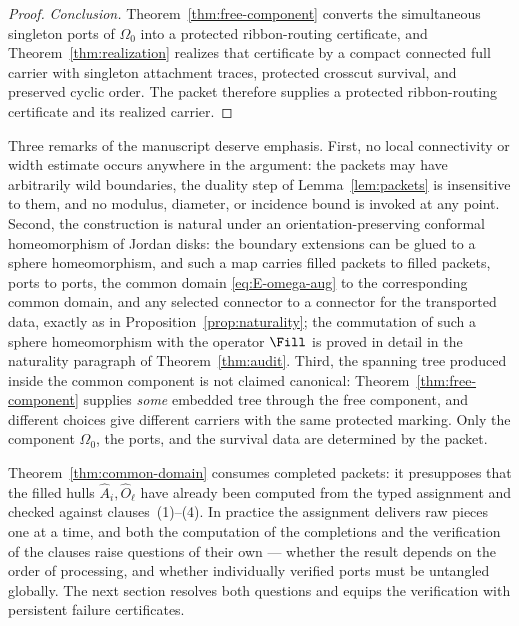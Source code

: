 \begin{proof}
\emph{Conclusion.}
Theorem~\ref{thm:free-component} converts the simultaneous singleton ports of
$\Omega_0$ into a protected ribbon-routing certificate, and
Theorem~\ref{thm:realization} realizes that certificate by a compact connected full
carrier with singleton attachment traces, protected crosscut survival, and preserved
cyclic order.  The packet therefore supplies a protected ribbon-routing
certificate and its realized carrier.
\end{proof}

\begin{remark}\label{rem:E-common-domain}
Three remarks of the manuscript \cite{MWman} deserve emphasis. First, no local
connectivity or width estimate occurs anywhere in the argument: the packets may have
arbitrarily wild boundaries, the duality step of Lemma~\ref{lem:packets} is
insensitive to them, and no modulus, diameter, or incidence bound is invoked at any
point. Second, the construction is natural under an orientation-preserving conformal
homeomorphism of Jordan disks: the boundary extensions can be glued to a sphere
homeomorphism, and such a map carries filled packets to filled packets, ports to
ports, the common domain \eqref{eq:E-omega-aug} to the corresponding common domain,
and any selected connector to a connector for the transported data, exactly as in
Proposition~\ref{prop:naturality}; the commutation of such a sphere homeomorphism
with the operator $\Fill$ is proved in detail in the naturality paragraph of
Theorem~\ref{thm:audit}. Third, the spanning tree produced inside the common
component is not claimed canonical: Theorem~\ref{thm:free-component} supplies
\emph{some} embedded tree through the free component, and different choices give
different carriers with the same protected marking. Only the component $\Omega_0$,
the ports, and the survival data are determined by the packet.
\end{remark}

Theorem~\ref{thm:common-domain} consumes completed packets: it presupposes that the
filled hulls $\widehat A_i,\widehat O_\ell$ have already been computed from the typed
assignment and checked against clauses~(1)--(4). In practice the assignment delivers
raw pieces one at a time, and both the computation of the completions and the
verification of the clauses raise questions of their own --- whether the result
depends on the order of processing, and whether individually verified ports must be
untangled globally. The next section resolves both questions and equips the
verification with persistent failure certificates.
